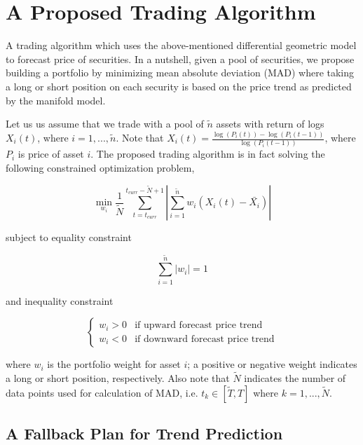\documentclass{article}
\begin{document}
\section{A Proposed Trading Algorithm}\label{section:trading-algorithm}

A trading algorithm which uses the above-mentioned differential
geometric model to forecast price of securities. In a nutshell, given
a pool of securities, we propose building a portfolio by minimizing
mean absolute deviation (MAD) where taking a long or short position on
each security is based on the price trend as predicted by the manifold
model.

Let us us assume that we trade with a pool of $\tilde{n}$ assets with
return of logs $X_{i}(t)$, where $i = 1, ...,\tilde{n}$. Note that
$X_{i}(t) = \frac{\log(P_{i}(t))
  -\log(P_{i}(t-1))}{\log(P_{i}(t-1))}$, where $P_{i}$ is price of
asset $i$. The proposed trading algorithm is in fact solving the
following constrained optimization problem,

\begin{equation}\label{eqn:mad-optimization-problem}
\min_{w_{i}} \frac{1}{\tilde{N}}\sum_{t=t_{curr}}^{t_{curr}-\tilde{N}+1}
|\sum_{i=1}^{\tilde{n}} w_{i} (X_{i}(t)-\bar{X_{i}})|
\end{equation}

subject to equality constraint

\begin{equation}\label{eqn:mad-sum-constraint}
\sum_{i=1}^{\tilde{n}} |w_{i}| = 1
\end{equation}

and inequality constraint

\[
\begin{cases}\label{eqn:mad-trend-constraint}
    w_{i} > 0 & \text{if upward forecast price trend} \\
    w_{i} < 0 & \text{if downward forecast price trend}
\end{cases}
\]

where $w_{i}$ is the portfolio weight for asset $i$; a positive or
negative weight indicates a long or short position, respectively. Also
note that $\tilde{N}$ indicates the number of data points used for
calculation of MAD, i.e. $t_{k} \in [\tilde{T},T]$ where $k = 1,
...,\tilde{N}$.

\subsection{A Fallback Plan for Trend Prediction}\label{subsection:fallback-macd}
\end{document}
